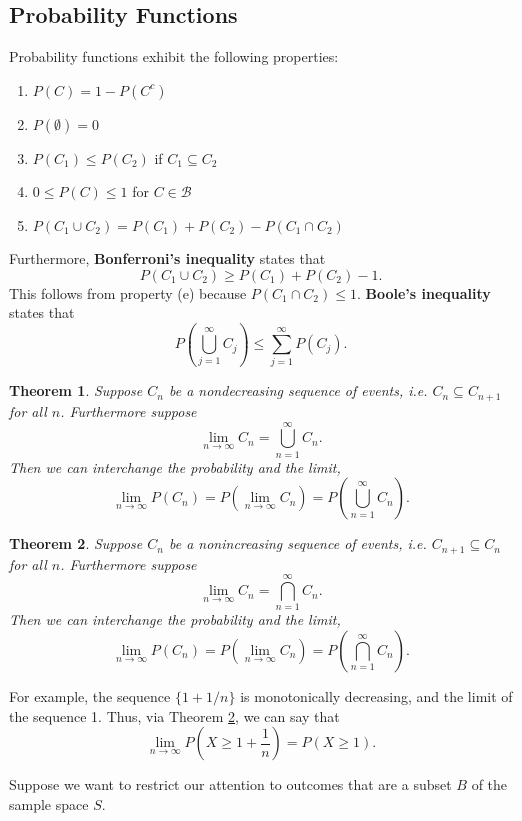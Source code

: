 \documentclass[12pt]{article}
\newcommand{\B}{\mathcal{B}}
\newtheorem{theorem}{Theorem}
\theoremstyle{definition}
\begin{document}
\subsection{Probability Functions}

Probability functions exhibit the following properties: 
\begin{enumerate}
	\item $P(C)=1-P(C^c)$
	\item $P(\emptyset)=0$
	\item $P(C_1) \leq P(C_2)$ if $C_1 \subseteq C_2$
	\item $0 \leq P(C) \leq 1$ for $C \in \B$
	\item $P(C_1 \cup C_2) = P(C_1) + P(C_2) - P(C_1 \cap C_2)$
\end{enumerate}
Furthermore, \textbf{Bonferroni's inequality} states that
	\[P(C_1 \cup C_2) \geq P(C_1) + P(C_2) - 1.	\]
This follows from property (e) because $P(C_1 \cap C_2) \leq 1$. \textbf{Boole's inequality} states that
	\[P \left( \bigcup_{j=1}^{\infty} C_j \right) \leq \sum_{j=1}^{\infty} P(C_j).	\]
	
\begin{theorem}
	Suppose $C_n$ be a nondecreasing sequence of events, i.e. $C_n \subseteq C_{n+1}$ for all $n$. Furthermore suppose 
		\[ \lim_{n \rightarrow \infty} C_n = \bigcup_{n=1}^{\infty} C_n.\]
		 Then we can interchange the probability and the limit, 
		 \[\lim_{n \rightarrow \infty} P(C_n) = P\left( \lim_{n \rightarrow \infty} C_n \right) = P\left( \bigcup_{n=1}^{\infty} C_n \right).\]
\end{theorem}

	
\begin{theorem} \label{nonincreasinglimit}
	Suppose $C_n$ be a nonincreasing sequence of events, i.e. $C_{n+1} \subseteq C_n$ for all $n$. Furthermore suppose 
		\[ \lim_{n \rightarrow \infty} C_n = \bigcap_{n=1}^{\infty} C_n.\]
		 Then we can interchange the probability and the limit, 
		 \[\lim_{n \rightarrow \infty} P(C_n) = P\left( \lim_{n \rightarrow \infty} C_n \right) = P\left( \bigcap_{n=1}^{\infty} C_n \right).\]
\end{theorem}
For example, the sequence $\{1 + 1/n\}$ is monotonically decreasing, and the limit of the sequence 1. Thus, via Theorem \ref{nonincreasinglimit}, we can say that 
	\[\lim_{n \rightarrow \infty} P\left(X \geq 1 + \frac{1}{n} \right) = P(X \geq 1).	\]



Suppose we want to restrict our attention to outcomes that are a subset $B$ of the sample space $S$.
\end{document}
